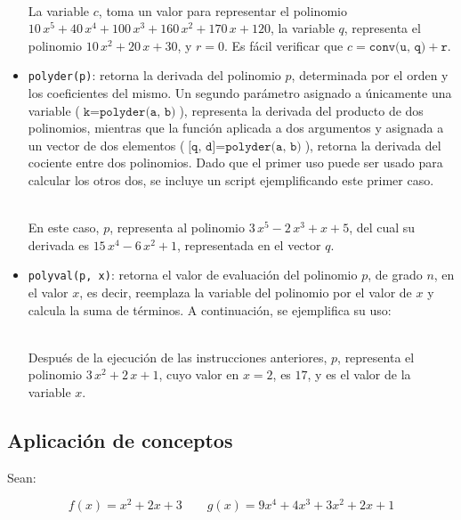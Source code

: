 \documentclass[11pt, spanish]{article}
\begin{document}
\begin{itemize}
\

La variable $c$, toma un valor para representar el polinomio $10\, x^5 + 40\, x^4 + 100\, x^3 + 160\, x^2 + 170\, x + 120$, la variable $q$, representa el polinomio $10\, x^2 + 20\, x + 30$, y $r  =  0$. Es fácil verificar que $c = \texttt{conv(u, q)} + \texttt{r}$.

\item \texttt{polyder(p)}: retorna la derivada del polinomio $p$, determinada por el orden y los coeficientes del mismo. Un segundo parámetro asignado a únicamente una variable ($\texttt{k} = \texttt{polyder(a, b)}$), representa la derivada del producto de dos polinomios, mientras que la función aplicada a dos argumentos y asignada a un vector de dos elementos ($\texttt{[q, d]} = \texttt{polyder(a, b)}$), retorna la derivada del cociente entre dos polinomios. Dado que el primer uso puede ser usado para calcular los otros dos, se incluye un script ejemplificando este primer caso.\\

\

En este caso, $p$, representa al polinomio $3\, x^5 - 2\, x^3 + x + 5$, del cual su derivada es $15\, x^4 - 6\, x^2 + 1$, representada en el vector $q$.

\item \texttt{polyval(p, x)}: retorna el valor de evaluación del polinomio $p$, de grado $n$, en el valor $x$, es decir, reemplaza la variable del polinomio por el valor de $x$ y calcula la suma de términos. A continuación, se ejemplifica su uso:\\

\

Después de la ejecución de las instrucciones anteriores, $p$, representa el polinomio $3\, x^2 + 2\, x + 1$, cuyo valor en $x = 2$, es $17$, y es el valor de la variable $x$.

\end{itemize}

\subsection{Aplicación de conceptos}

Sean:

$$f(x) = x^2+2x+3 \qquad g(x) = 9x^4+4x^3+3x^2+2x+1$$
\end{document}
